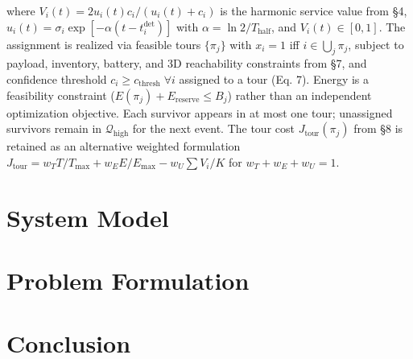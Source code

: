 \documentclass[conference]{IEEEtran}
\begin{document}
where $V_i(t)=2u_i(t)c_i/(u_i(t)+c_i)$ is the harmonic service value from \S4, $u_i(t)=\sigma_i\exp[-\alpha(t-t_i^{\text{det}})]$ with $\alpha=\ln2/T_{\text{half}}$, and $V_i(t)\in[0,1]$. The assignment is realized via feasible tours $\{\pi_j\}$ with $x_i=1$ iff $i\in\bigcup_j\pi_j$, subject to payload, inventory, battery, and 3D reachability constraints from \S7, and confidence threshold $c_i\geq c_{\text{thresh}}\;\forall i$ assigned to a tour (Eq. 7). Energy is a feasibility constraint ($E(\pi_j)+E_{\text{reserve}}\leq B_j$) rather than an independent optimization objective. Each survivor appears in at most one tour; unassigned survivors remain in $\mathcal{Q}_{\text{high}}$ for the next event. The tour cost $J_{\text{tour}}(\pi_j)$ from \S8 is retained as an alternative weighted formulation $J_{\text{tour}}=w_TT/T_{\max}+w_EE/E_{\max}-w_U\sum V_i/K$ for $w_T+w_E+w_U=1$.

\section{System Model}


\section{Problem Formulation}


\section{Conclusion}

\end{document}
